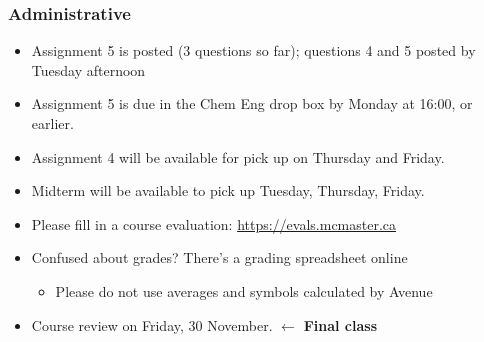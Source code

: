 \begin{comment}
	Why remove water
	Terminology
	Equilibrium curves (C+R, Santiago, p7)

	Psychrometry: useful for determining humidity content (kg//kg) of air at a given temperature and given RH
	Bound vs unbound moisture
	Drying curve


	Equipment for removing water
	Fluidized bed system
\end{comment}

\begin{frame}\frametitle{Administrative}
	\begin{itemize}
		\item	Assignment 5 is posted (3 questions so far); questions 4 and 5 posted by Tuesday afternoon
		\item	Assignment 5 is due in the Chem Eng drop box by Monday at 16:00, or earlier.
		\item	Assignment 4 will be available for pick up on Thursday and Friday.
		\item	Midterm will be available to pick up Tuesday, Thursday, Friday.
		\item	Please fill in a course evaluation: \href{https://evals.mcmaster.ca}{https://evals.mcmaster.ca}
		\item	Confused about grades? There's a grading spreadsheet online
		\begin{itemize}
			\item	Please do not use averages and symbols calculated by Avenue
		\end{itemize}
	\end{itemize}
	\vspace{12pt}
	\begin{itemize}
		\item	Course review on Friday, 30 November. {\color{myOrange} \hfill $\longleftarrow$ {\textbf{Final class}}}
	\end{itemize}
\end{frame}

